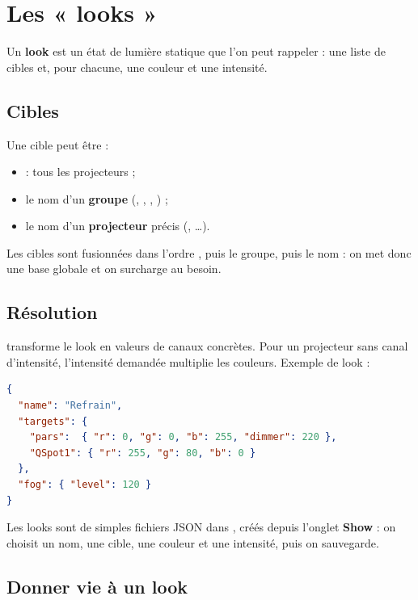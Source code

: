 \chapter{Les « looks »}
\label{ch:looks}

Un \textbf{look} est un état de lumière statique que l'on peut rappeler : une
liste de cibles et, pour chacune, une couleur et une intensité.

\section{Cibles}

Une cible peut être :

\begin{itemize}[leftmargin=1.4em]
  \item {} : tous les projecteurs ;
  \item le nom d'un \textbf{groupe} (, , ,
        ) ;
  \item le nom d'un \textbf{projecteur} précis (, \dots).
\end{itemize}

Les cibles sont fusionnées dans l'ordre , puis le groupe, puis le
nom : on met donc une base globale et on surcharge au besoin.

\section{Résolution}

 transforme le look en valeurs de canaux concrètes. Pour un
projecteur sans canal d'intensité, l'intensité demandée \og{}multiplie\fg{} les
couleurs. Exemple de look :

\begin{lstlisting}[language=json,caption={Un look : base bleue, projecteurs rouges.}]
{
  "name": "Refrain",
  "targets": {
    "pars":  { "r": 0, "g": 0, "b": 255, "dimmer": 220 },
    "QSpot1": { "r": 255, "g": 80, "b": 0 }
  },
  "fog": { "level": 120 }
}
\end{lstlisting}

Les looks sont de simples fichiers JSON dans , créés depuis
l'onglet \textbf{Show} : on choisit un nom, une cible, une couleur et une
intensité, puis on sauvegarde.

\section{Donner vie à un look}

